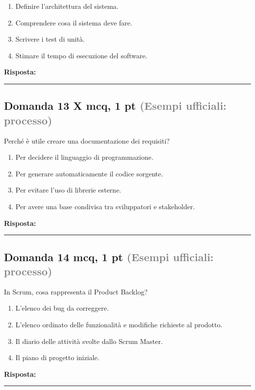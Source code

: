 \documentclass[a4paper,11pt]{article}
\begin{document}
\begin{enumerate}[label=\alph*)]
\item Definire l'architettura del sistema.
\item Comprendere cosa il sistema deve fare.
\item Scrivere i test di unità.
\item Stimare il tempo di esecuzione del software.
\end{enumerate}
\vspace{0.2cm}
\noindent\textbf{Risposta:}\par
\vspace{1.5cm}\hrule


\subsection*{Domanda 13 X \hfill {\small mcq, 1 pt \textcolor{gray}{(Esempi ufficiali: processo)}}}
Perché è utile creare una documentazione dei requisiti?

\begin{enumerate}[label=\alph*)]
\item Per decidere il linguaggio di programmazione.
\item Per generare automaticamente il codice sorgente.
\item Per evitare l'uso di librerie esterne.
\item Per avere una base condivisa tra sviluppatori e stakeholder.
\end{enumerate}
\vspace{0.2cm}
\noindent\textbf{Risposta:}\par
\vspace{1.5cm}\hrule


\subsection*{Domanda 14 \hfill {\small mcq, 1 pt \textcolor{gray}{(Esempi ufficiali: processo)}}}
In Scrum, cosa rappresenta il Product Backlog?

\begin{enumerate}[label=\alph*)]
\item L'elenco dei bug da correggere.
\item L'elenco ordinato delle funzionalità e modifiche richieste al prodotto.
\item Il diario delle attività svolte dallo Scrum Master.
\item Il piano di progetto iniziale.
\end{enumerate}
\vspace{0.2cm}
\noindent\textbf{Risposta:}\par
\vspace{1.5cm}\hrule
\end{document}

